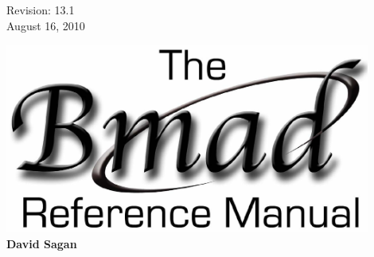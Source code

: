 \thispagestyle{empty}

\begin{flushright}
\large
  Revision: 13.1 \\
  August 16, 2010 \\
\end{flushright}

\vfill

{
\begin{center}
\includegraphics[width=12cm]{bmad-ref-manual.pdf} \\
\vskip 0.3in
\huge\bf David Sagan
\end{center}
}

\vfill
\break

